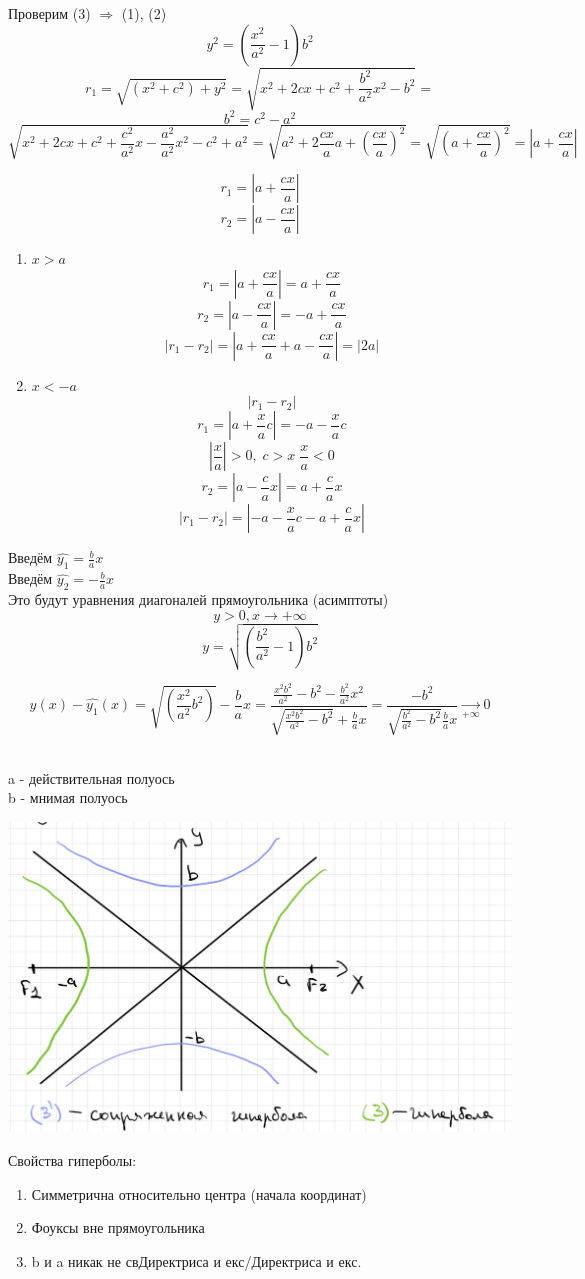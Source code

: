 \documentclass[12pt, paper]{article}
\begin{document}
Проверим (3) $ \Rightarrow$ (1), (2)
\[ y^2 = (\frac{x^2}{a^2} - 1)b^2 \]
\[ r_1 = \sqrt{(x^2+c^2)+y^2} = \sqrt{x^2 + 2cx + c^2 + \frac{b^2}{a^2}x^2 - b^2} = \]
\[ b^2 = c^2 - a^2 \]
\[ \sqrt{x^2 + 2cx + c^2 + \frac{c^2}{a^2}x - \frac{a^2}{a^2}x^2 - c^2 + a^2} = \sqrt{a^2 + 2\frac{cx}{a}a + (\frac{cx}{a})^2} = \sqrt{(a+\frac{cx}{a})^2} = |a+\frac{cx}{a}| \]

\begin{tcolorbox}
	\[ r_1 = |a+\frac{cx}{a}| \]
	\[ r_2 = |a-\frac{cx}{a}| \]
\end{tcolorbox}

\begin{enumerate}
	\item $x > a$
	\[ r_1 = |a+\frac{cx}{a}| = a + \frac{cx}{a} \]
	\[ r_2 = |a-\frac{cx}{a}| = -a + \frac{cx}{a} \]
	\[ |r_1-r_2| = |a+\frac{cx}{a} + a - \frac{cx}{a}| = |2a| \]
	\item $x < -a$
	\[ |r_1-r_2| \]
	\[r_1 = |a + \frac{x}{a}c| = -a -\frac{x}{a}c\]
	\[ |\frac{x}{a}| > 0,\; c > x\; \frac{x}{a} < 0 \]
	\[r_2 = |a - \frac{c}{a}x| = a + \frac{c}{a}x\]
	\[ |r_1-r_2| = |-a-\frac{x}{a}c - a + \frac{c}{a}x|\]

\end{enumerate}

Введём $\hat{y_1} = \frac{b}{a}x$\\
Введём $\hat{y_2} = -\frac{b}{a}x$\\
Это будут уравнения диагоналей прямоугольника (асимптоты)
\[ y > 0, x\to +\infty \]
\[ y = \sqrt{(\frac{b^2}{a^2} - 1)b^2} \]



\[ y(x) - \hat{y_1}(x) = \sqrt{(\frac{x^2}{a^2}b^2)} - \frac{b}{a}x = \frac{\frac{x^2b^2}{a^2} - b^2 - \frac{b^2}{a^2}x^2}{\sqrt{\frac{x^2b^2}{a^2} - b^2} + \frac{b}{a}x} = \frac{-b^2}{\sqrt{\frac{b^2}{a^2} - b^2} \frac{b}{a}x } \xrightarrow[+\infty]{} 0 \]

\\a - действительная полуось\\
b - мнимая полуось\\
\begin{center}
	\includegraphics[width=0.5\linewidth]{images/Прямые 2 порядка/Гипербола/Прямоугольничек.jpg}\\
\end{center}
Свойства гиперболы:
\begin{enumerate}
	\item Симметрична относительно центра (начала координат)
	\item Фоуксы вне прямоугольника
	\item b и a никак не свДиректриса и екс/Директриса и екс.
\end{enumerate}
\end{document}
